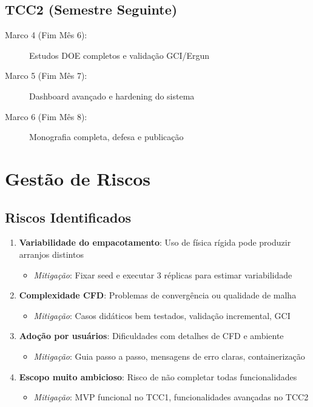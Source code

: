 \subsection{TCC2 (Semestre Seguinte)}

\begin{description}
    \item[Marco 4 (Fim Mês 6):] Estudos DOE completos e validação GCI/Ergun
    \item[Marco 5 (Fim Mês 7):] Dashboard avançado e hardening do sistema
    \item[Marco 6 (Fim Mês 8):] Monografia completa, defesa e publicação
\end{description}

\section{Gestão de Riscos}

\subsection{Riscos Identificados}

\begin{enumerate}
    \item \textbf{Variabilidade do empacotamento}: Uso de física rígida pode produzir arranjos distintos
    \begin{itemize}
        \item \textit{Mitigação}: Fixar seed e executar 3 réplicas para estimar variabilidade
    \end{itemize}
    
    \item \textbf{Complexidade CFD}: Problemas de convergência ou qualidade de malha
    \begin{itemize}
        \item \textit{Mitigação}: Casos didáticos bem testados, validação incremental, GCI
    \end{itemize}
    
    \item \textbf{Adoção por usuários}: Dificuldades com detalhes de CFD e ambiente
    \begin{itemize}
        \item \textit{Mitigação}: Guia passo a passo, mensagens de erro claras, containerização
    \end{itemize}
    
    \item \textbf{Escopo muito ambicioso}: Risco de não completar todas funcionalidades
    \begin{itemize}
        \item \textit{Mitigação}: MVP funcional no TCC1, funcionalidades avançadas no TCC2
    \end{itemize}
\end{enumerate}

